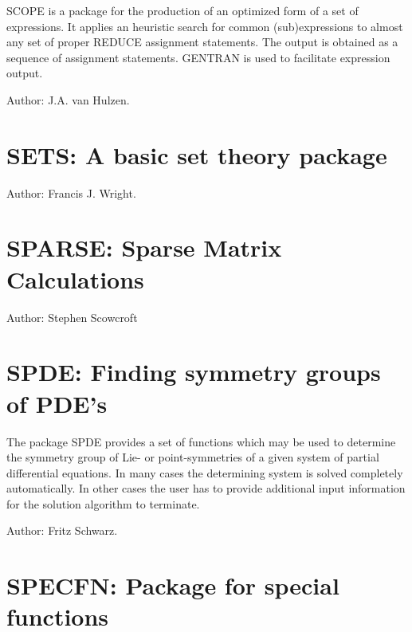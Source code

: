 SCOPE is a package for the production of an optimized form of a set of
expressions.  It applies an heuristic search for common (sub)expressions
to almost any set of proper REDUCE assignment statements.  The
output is obtained as a sequence of assignment statements.  GENTRAN is
used to facilitate expression output.

Author:  J.A. van Hulzen.

\newpage

\section{SETS: A basic set theory package}


Author: Francis J. Wright.



\newpage

\section{SPARSE: Sparse Matrix Calculations}

Author: Stephen Scowcroft



\newpage

\section{SPDE: Finding symmetry groups of {PDE}'s}

\label{package:SPDE}

The package SPDE provides a set of functions which may be used to
determine the symmetry group of Lie- or point-symmetries of a given system
of partial differential equations. In many cases the determining system is
solved completely automatically. In other cases the user has to provide
additional input information for the solution algorithm to terminate.

Author: Fritz Schwarz.



\newpage

\section{SPECFN: Package for special functions}

